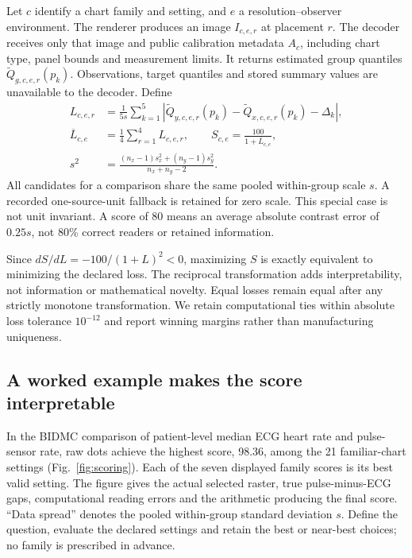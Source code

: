 \documentclass[11pt]{article}
\begin{document}
Let $c$ identify a chart family and setting, and $e$ a resolution--observer environment. The renderer produces an image $I_{c,e,r}$ at placement $r$. The decoder receives only that image and public calibration metadata $A_c$, including chart type, panel bounds and measurement limits. It returns estimated group quantiles $\widetilde Q_{g,c,e,r}(p_k)$. Observations, target quantiles and stored summary values are unavailable to the decoder. Define
\begin{align}
L_{c,e,r}&=\frac{1}{5s}\sum_{k=1}^5|\widetilde Q_{y,c,e,r}(p_k)-\widetilde Q_{x,c,e,r}(p_k)-\Delta_k|,\\
\overline L_{c,e}&=\frac14\sum_{r=1}^4L_{c,e,r},\qquad S_{c,e}=\frac{100}{1+\overline L_{c,e}},\label{eq:score}\\
s^2&=\frac{(n_x-1)s_x^2+(n_y-1)s_y^2}{n_x+n_y-2}.
\end{align}
All candidates for a comparison share the same pooled within-group scale $s$. A recorded one-source-unit fallback is retained for zero scale. This special case is not unit invariant. A score of 80 means an average absolute contrast error of $0.25s$, not 80\% correct readers or retained information.

Since $dS/dL=-100/(1+L)^2<0$, maximizing $S$ is exactly equivalent to minimizing the declared loss. The reciprocal transformation adds interpretability, not information or mathematical novelty. Equal losses remain equal after any strictly monotone transformation. We retain computational ties within absolute loss tolerance $10^{-12}$ and report winning margins rather than manufacturing uniqueness.

\subsection*{A worked example makes the score interpretable}
In the BIDMC comparison of patient-level median ECG heart rate and pulse-sensor rate, raw dots achieve the highest score, 98.36, among the 21 familiar-chart settings (Fig.~\ref{fig:scoring}). Each of the seven displayed family scores is its best valid setting. The figure gives the actual selected raster, true pulse-minus-ECG gaps, computational reading errors and the arithmetic producing the final score. ``Data spread'' denotes the pooled within-group standard deviation $s$. Define the question, evaluate the declared settings and retain the best or near-best choices; no family is prescribed in advance.
\end{document}
